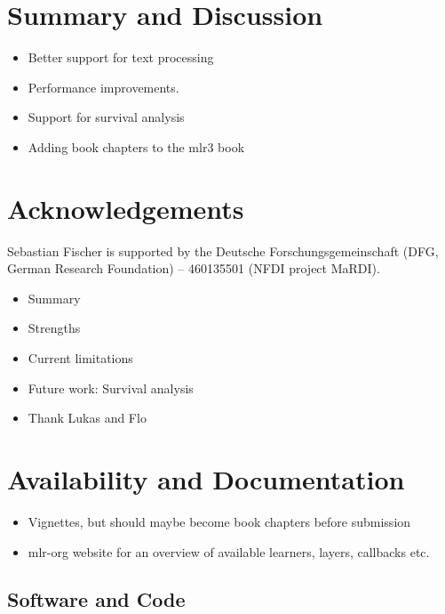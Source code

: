 \documentclass[article, nojss]{jss}
\theoremstyle{definition}
\begin{document}
\section{Summary and Discussion}\label{sec:summary}

\begin{itemize}
    \item Better support for text processing
    \item Performance improvements.
    \item Support for survival analysis
    \item Adding book chapters to the mlr3 book 

    
\end{itemize}

\section*{Acknowledgements}

Sebastian Fischer is supported by the Deutsche Forschungsgemeinschaft (DFG, German Research Foundation) – 460135501 (NFDI project MaRDI).

\begin{itemize}
    \item Summary
    \item Strengths
    \item Current limitations
    \item Future work: Survival analysis
    \item Thank Lukas and Flo
\end{itemize}

\listoftodos

\section{Availability and Documentation}

\begin{itemize}
    \item Vignettes, but should maybe become book chapters before submission
    \item mlr-org website for an overview of available learners, layers, callbacks etc.
\end{itemize}

\subsection{Software and Code}
\end{document}
